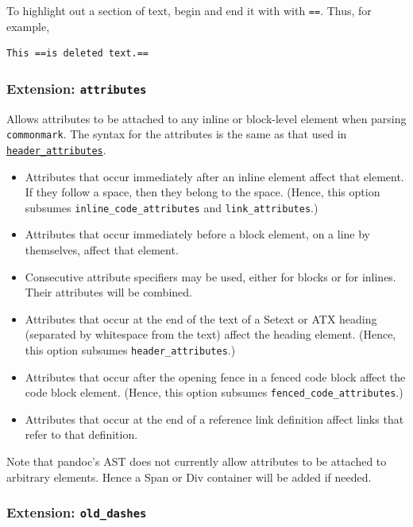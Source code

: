 \documentclass[
]{article}
\providecommand{\tightlist}{%
  \setlength{\itemsep}{0pt}\setlength{\parskip}{0pt}}
\begin{document}
To highlight out a section of text, begin and end it with with
\texttt{==}. Thus, for example,

\begin{verbatim}
This ==is deleted text.==
\end{verbatim}

\hypertarget{extension-attributes}{%
\subsubsection{\texorpdfstring{Extension:
\texttt{attributes}}{Extension: attributes}}\label{extension-attributes}}

Allows attributes to be attached to any inline or block-level element
when parsing \texttt{commonmark}. The syntax for the attributes is the
same as that used in
\protect\hyperlink{extension-header_attributes}{\texttt{header\_attributes}}.

\begin{itemize}
\tightlist
\item
  Attributes that occur immediately after an inline element affect that
  element. If they follow a space, then they belong to the space.
  (Hence, this option subsumes \texttt{inline\_code\_attributes} and
  \texttt{link\_attributes}.)
\item
  Attributes that occur immediately before a block element, on a line by
  themselves, affect that element.
\item
  Consecutive attribute specifiers may be used, either for blocks or for
  inlines. Their attributes will be combined.
\item
  Attributes that occur at the end of the text of a Setext or ATX
  heading (separated by whitespace from the text) affect the heading
  element. (Hence, this option subsumes \texttt{header\_attributes}.)
\item
  Attributes that occur after the opening fence in a fenced code block
  affect the code block element. (Hence, this option subsumes
  \texttt{fenced\_code\_attributes}.)
\item
  Attributes that occur at the end of a reference link definition affect
  links that refer to that definition.
\end{itemize}

Note that pandoc's AST does not currently allow attributes to be
attached to arbitrary elements. Hence a Span or Div container will be
added if needed.

\hypertarget{extension-old_dashes}{%
\subsubsection{\texorpdfstring{Extension:
\texttt{old\_dashes}}{Extension: old\_dashes}}\label{extension-old_dashes}}
\end{document}
